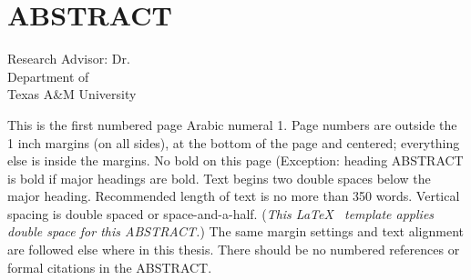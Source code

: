 %
%
%
%

\chapter*{ABSTRACT}


\pagestyle{plain} %
\setcounter{page}{1}
\begin{center}

\begin{singlespace}
\abstracttitle
\end{singlespace}
\vspace{2em}
\vspace{2em}
\begin{singlespace}
Research Advisor: Dr. \ursadvisor \\
Department of \advisordepartment \\
Texas A\&M University \\
\end{singlespace}
\end{center}
\vspace{2em}

\indent This is the first numbered page Arabic numeral 1. Page
numbers are outside the 1 inch margins (on all sides), at the bottom of the page and centered; everything else is inside the margins. No bold on this page (Exception: heading ABSTRACT is bold if major headings are bold. Text begins two double spaces below the major heading. Recommended length of
text is no more than 350 words. Vertical spacing is double spaced or
space-and-a-half. (\emph{This \LaTeX ~ template applies double space for this
ABSTRACT.}) The same margin settings and text alignment are followed else where
in this thesis. There should be no numbered references or formal citations in
the ABSTRACT.

